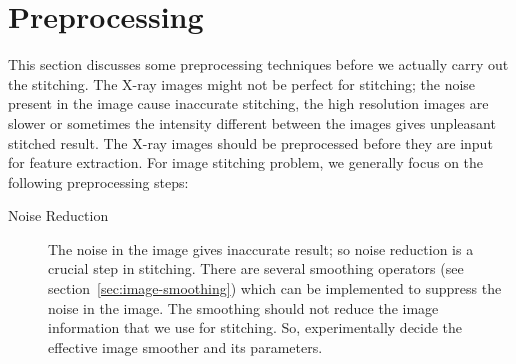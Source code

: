 \section{Preprocessing}
\label{sec:preprocessing}
This section discusses some preprocessing techniques before we actually carry out the stitching. The X-ray images might not be perfect for stitching; the noise present in the image cause inaccurate stitching, the high resolution images are slower or sometimes the intensity different between the images gives unpleasant stitched result. The X-ray images should be preprocessed before they are input for feature extraction. For image stitching problem, we generally focus on the following preprocessing steps:
\begin{description}
	\item [Noise Reduction] The noise in the image gives inaccurate result; so noise reduction is a crucial step in stitching. There are several smoothing operators (see section~\ref{sec:image-smoothing}) which can be implemented to suppress the noise in the image. The smoothing should not reduce the image information that we use for stitching. So, experimentally decide the effective image smoother and its parameters.
	

\end{description}
